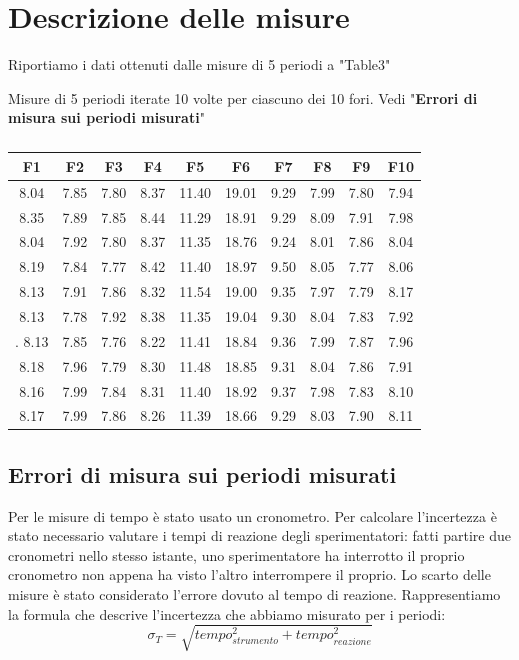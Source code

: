 \documentclass[11pt]{article}
\begin{document}
\section{Descrizione delle misure}

Riportiamo i dati ottenuti dalle misure  di 5 periodi  a "Table3"

\begin{table}
    \centering
    \caption{Misure di 5 periodi iterate 10 volte per ciascuno dei 10 fori. Vedi "\textbf {Errori di misura sui periodi misurati}"}
 
    \begin{tabular}{|c|c|c|c|c|c|c|c|c|c|}
        \hline
        \textbf{F1} & \textbf{F2} & \textbf{F3} & \textbf{F4} & \textbf{F5} & \textbf{F6} & \textbf{F7} & \textbf{F8} & \textbf{F9} & \textbf{F10} \\
        \hline
 
  8.04 & 7.85 & 7.80 & 8.37 & 11.40 & 19.01 & 9.29 & 7.99 & 7.80 & 7.94 \\
  8.35 & 7.89 & 7.85 & 8.44 & 11.29 & 18.91 & 9.29 & 8.09 & 7.91 & 7.98 \\
  8.04 & 7.92 & 7.80 & 8.37 & 11.35 & 18.76 & 9.24 & 8.01 & 7.86 & 8.04 \\
  8.19 & 7.84 & 7.77 & 8.42 & 11.40 & 18.97 & 9.50 & 8.05 & 7.77 & 8.06 \\
  8.13 & 7.91 & 7.86 & 8.32 & 11.54 & 19.00 & 9.35 & 7.97 & 7.79 & 8.17 \\
  8.13 & 7.78 & 7.92 & 8.38 & 11.35 & 19.04 & 9.30 & 8.04 & 7.83 & 7.92 \\.
  8.13 & 7.85 & 7.76 & 8.22 & 11.41 & 18.84 & 9.36 & 7.99 & 7.87 & 7.96 \\
  8.18 & 7.96 & 7.79 & 8.30 & 11.48 & 18.85 & 9.31 & 8.04 & 7.86 & 7.91 \\
  8.16 & 7.99 & 7.84 & 8.31 & 11.40 & 18.92 & 9.37 & 7.98 & 7.83 & 8.10 \\
  8.17 & 7.99 & 7.86 & 8.26 & 11.39 & 18.66 & 9.29 & 8.03 & 7.90 & 8.11 \\
 \hline
    \end{tabular}
   \caption{}
\end{table}


\subsection{Errori di misura sui periodi misurati}
Per le misure di tempo è stato usato un cronometro. Per calcolare l'incertezza è stato necessario valutare i tempi di reazione degli sperimentatori: fatti partire due cronometri nello stesso istante, uno sperimentatore ha interrotto il proprio cronometro non appena ha visto l'altro interrompere il proprio. Lo scarto delle misure è stato considerato l'errore dovuto al tempo di reazione.
Rappresentiamo la formula che descrive l'incertezza che abbiamo misurato per i periodi:
\begin{equation}
\sigma_T=\sqrt{tempo_{strumento}^2 + tempo_{reazione}^2}
\end{equation}
\end{document}
